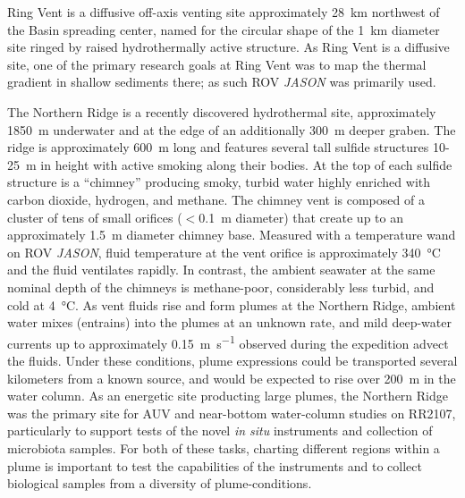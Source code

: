 Ring Vent is a diffusive off-axis venting site approximately \SI{28}{\kilo\meter} northwest of the Basin spreading center, named for the circular shape of the \SI{1}{\kilo\meter} diameter site ringed by raised hydrothermally active structure\autocite{teske2019characteristics}. As Ring Vent is a diffusive site, one of the primary research goals at Ring Vent was to map the thermal gradient in shallow sediments there; as such ROV \emph{JASON} was primarily used.

The Northern Ridge is a recently discovered hydrothermal site\autocite{soule2018exploration, geilert2018formation}, approximately \SI{1850}{\meter} underwater and at the edge of an additionally \SI{300}{\meter} deeper graben. The ridge is approximately \SI{600}{\meter} long and features several tall sulfide structures 10-\SI{25}{\meter} in height with active smoking along their bodies. At the top of each sulfide structure is a ``chimney'' producing smoky, turbid water highly enriched with carbon dioxide, hydrogen, and methane. The chimney vent is composed of a cluster of tens of small orifices ($<$\SI{0.1}{\meter} diameter) that create up to an approximately \SI{1.5}{\meter} diameter chimney base. Measured with a temperature wand on ROV \emph{JASON}, fluid temperature at the vent orifice is approximately \SI{340}{\celsius} and the fluid ventilates rapidly. In contrast, the ambient seawater at the same nominal depth of the chimneys is methane-poor, considerably less turbid, and cold at \SI{4}{\celsius}. As vent fluids rise and form plumes at the Northern Ridge, ambient water mixes (entrains) into the plumes at an unknown rate, and mild deep-water currents up to approximately \SI{0.15}{\meter\per\second} observed during the expedition advect the fluids. Under these conditions, plume expressions could be transported several kilometers from a known source, and would be expected to rise over \SI{200}{\meter} in the water column\autocite{speer1989model}. As an energetic site producting large plumes, the Northern Ridge was the primary site for AUV \Sentry and near-bottom water-column studies on RR2107, particularly to support tests of the novel \emph{in situ} instruments and collection of microbiota samples. For both of these tasks, charting different regions within a plume is important to test the capabilities of the instruments and to collect biological samples from a diversity of plume-conditions.



